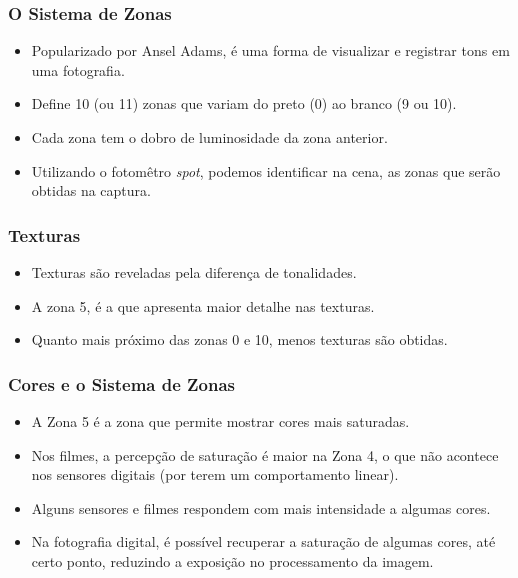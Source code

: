
\begin{frame}
    \frametitle{O Sistema de Zonas}
    \begin{itemize}
      \item Popularizado por Ansel Adams, é uma forma de visualizar e registrar
      tons em uma fotografia.
      \item Define 10 (ou 11) zonas que variam do preto (0) ao branco (9 ou 10).
      \item Cada zona tem o dobro de luminosidade da zona anterior.
      \item Utilizando o fotomêtro \textit{spot}, podemos identificar na cena, as
      zonas que serão obtidas na captura.
    \end{itemize}
\end{frame}



\begin{frame}
    \frametitle{Texturas}
    \begin{itemize}
      \item Texturas são reveladas pela diferença de tonalidades.
      \item A zona 5, é a que apresenta maior detalhe nas texturas.
      \item Quanto mais próximo das zonas 0 e 10, menos texturas são obtidas.
    \end{itemize}
\end{frame}


\begin{frame}
    \frametitle{Cores e o Sistema de Zonas}
    \begin{itemize}
      \item A Zona 5 é a zona que permite mostrar cores mais saturadas.
      \item Nos filmes, a percepção de saturação é maior na Zona 4, o que não acontece nos sensores
      digitais (por terem um comportamento linear).
      \item Alguns sensores e filmes respondem com mais intensidade a algumas cores.
      \item Na fotografia digital, é possível recuperar a saturação de algumas cores,
      até certo ponto, reduzindo a exposição no processamento da imagem.
    \end{itemize}
\end{frame}

